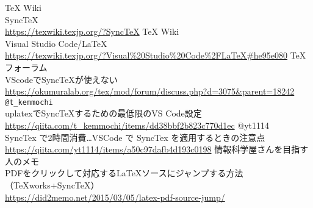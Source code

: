 \documentclass{ltjsarticle}
\begin{document}
\begin{thebibliography}{999}
  TeX Wiki\\
  SyncTeX\\
  \url{https://texwiki.texjp.org/?SyncTeX}
  TeX Wiki\\
  Visual Studio Code/LaTeX\\
  \url{https://texwiki.texjp.org/?Visual%20Studio%20Code%2FLaTeX#he95e080}
  TeXフォーラム\\
  VScodeでSyncTeXが使えない\\
  \url{https://okumuralab.org/tex/mod/forum/discuss.php?d=3075&parent=18242}
  \verb|@t_kemmochi|\\
  uplatexでSyncTeXするための最低限のVS Code設定\\
  \url{https://qiita.com/t_kemmochi/items/dd38bbf2b823c770d1ec}
  @yt1114\\
  SyncTex で2時間消費…VSCode で SyncTex を適用するときの注意点\\
  \url{https://qiita.com/yt1114/items/a50c97dafb4d193c0198}
  情報科学屋さんを目指す人のメモ\\
  PDFをクリックして対応するLaTeXソースにジャンプする方法（TeXworks+SyncTeX）\\
  \url{https://did2memo.net/2015/03/05/latex-pdf-source-jump/}


\end{thebibliography}
\end{document}
